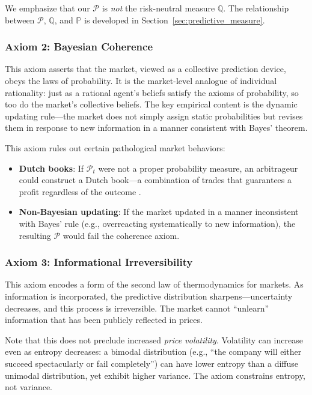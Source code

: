 \documentclass[12pt,a4paper]{article}
\theoremstyle{definition}
\newcommand{\Prob}{\mathbb{P}}
\newcommand{\Q}{\mathbb{Q}}
\newcommand{\PP}{\mathcal{P}}
\begin{document}
We emphasize that our $\PP$ is \emph{not} the risk-neutral measure $\Q$. The relationship between $\PP$, $\Q$, and $\Prob$ is developed in Section~\ref{sec:predictive_measure}.

\subsubsection{Axiom 2: Bayesian Coherence}

This axiom asserts that the market, viewed as a collective prediction device, obeys the laws of probability. It is the market-level analogue of individual rationality: just as a rational agent's beliefs satisfy the axioms of probability, so too do the market's collective beliefs. The key empirical content is the dynamic updating rule---the market does not simply assign static probabilities but revises them in response to new information in a manner consistent with Bayes' theorem.

This axiom rules out certain pathological market behaviors:
\begin{itemize}
    \item \textbf{Dutch books}: If $\PP_t$ were not a proper probability measure, an arbitrageur could construct a Dutch book---a combination of trades that guarantees a profit regardless of the outcome \citep{definetti1937}.
    \item \textbf{Non-Bayesian updating}: If the market updated in a manner inconsistent with Bayes' rule (e.g., overreacting systematically to new information), the resulting $\PP$ would fail the coherence axiom.
\end{itemize}

\subsubsection{Axiom 3: Informational Irreversibility}

This axiom encodes a form of the second law of thermodynamics for markets. As information is incorporated, the predictive distribution sharpens---uncertainty decreases, and this process is irreversible. The market cannot ``unlearn'' information that has been publicly reflected in prices.

Note that this does not preclude increased \emph{price volatility}. Volatility can increase even as entropy decreases: a bimodal distribution (e.g., ``the company will either succeed spectacularly or fail completely'') can have lower entropy than a diffuse unimodal distribution, yet exhibit higher variance. The axiom constrains entropy, not variance.
\end{document}
